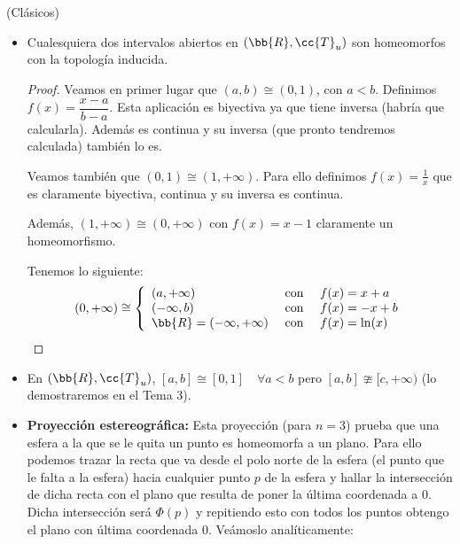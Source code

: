 \begin{ejemplo}(Clásicos)
    \begin{itemize}
        \item Cualesquiera dos intervalos abiertos en $(\bb{R}, \cc{T}_u)$ son homeomorfos con la topología inducida.
        \begin{proof}
            Veamos en primer lugar que $(a,b) \cong (0,1)$, con $a<b$. Definimos $f(x)=\dfrac{x-a}{b-a}$. Esta aplicación es biyectiva ya que tiene inversa (habría que calcularla). Además es continua y su inversa (que pronto tendremos calculada) también lo es.

            Veamos también que $(0,1)\cong (1, +\infty)$. Para ello definimos $f(x)=\frac{1}{x}$ que es claramente biyectiva, continua y su inversa es continua.

            Además, $(1, +\infty)\cong (0,+\infty)$ con $f(x)=x-1$ claramente un homeomorfismo.

            Tenemos lo siguiente:
            \begin{gather*}
                (0,+\infty)\cong \left\{
                \begin{array}{lcl}
                    (a, +\infty) & \text{ con } & f(x)=x+a\\
                    (-\infty, b) & \text{ con } & f(x) = -x +b\\
                    \bb{R}=(-\infty, +\infty) & \text{ con } & f(x)=\ln(x)\\
                \end{array}
                \right.
            \end{gather*}
        \end{proof}

        \item En $(\bb{R}, \cc{T}_u)$, $[a,b]\cong [0,1]$\ \ $\forall a<b$ pero $[a,b]\ncong [c, +\infty)$ (lo demostraremos en el Tema 3).
        
        \item \textbf{Proyección estereográfica:} Esta proyección (para $n=3$) prueba que una esfera a la que se le quita un punto es homeomorfa a un plano. Para ello podemos trazar la recta que va desde el polo norte de la esfera (el punto que le falta a la esfera) hacia cualquier punto $p$ de la esfera y hallar la intersección de dicha recta con el plano que resulta de poner la última coordenada a 0. Dicha intersección será $\Phi(p)$ y repitiendo esto con todos los puntos obtengo el plano con última coordenada 0. Veámoslo analíticamente:
        

\end{itemize}
\end{ejemplo}
